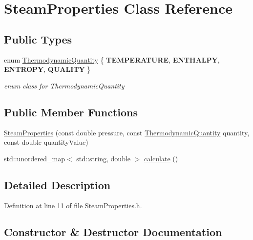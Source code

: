 \hypertarget{class_steam_properties}{}\section{Steam\+Properties Class Reference}
\label{class_steam_properties}
\subsection*{Public Types}
\begin{DoxyCompactItemize}
\item 
\mbox{\label{class_steam_properties_ae0294bedf7d178c2d8fb6aed0f62fbff}} 
enum \hyperlink{class_steam_properties_ae0294bedf7d178c2d8fb6aed0f62fbff}{Thermodynamic\+Quantity} \{ {\bfseries T\+E\+M\+P\+E\+R\+A\+T\+U\+RE}, 
{\bfseries E\+N\+T\+H\+A\+L\+PY}, 
{\bfseries E\+N\+T\+R\+O\+PY}, 
{\bfseries Q\+U\+A\+L\+I\+TY}
 \}\begin{DoxyCompactList}\small\item\em enum class for Thermodynamic\+Quantity \end{DoxyCompactList}
\end{DoxyCompactItemize}
\subsection*{Public Member Functions}
\begin{DoxyCompactItemize}
\item 
\hyperlink{class_steam_properties_a976e08ed0433943d469a8c2f75d2ac68}{Steam\+Properties} (const double pressure, const \hyperlink{class_steam_properties_ae0294bedf7d178c2d8fb6aed0f62fbff}{Thermodynamic\+Quantity} quantity, const double quantity\+Value)
\item 
std\+::unordered\+\_\+map$<$ std\+::string, double $>$ \hyperlink{class_steam_properties_a449e2da87adb5a207bc73ec90f87922a}{calculate} ()
\end{DoxyCompactItemize}


\subsection{Detailed Description}


Definition at line 11 of file Steam\+Properties.\+h.



\subsection{Constructor \& Destructor Documentation}
\mbox{\label{class_steam_properties_a976e08ed0433943d469a8c2f75d2ac68}} 
